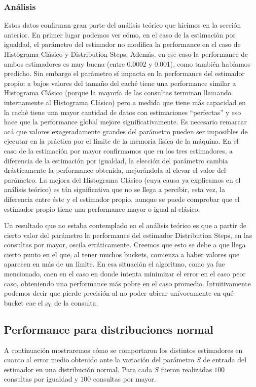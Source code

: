  \subsubsection*{Análisis}
Estos datos confirman gran parte del análisis teórico que hicimos en la sección anterior. En primer lugar podemos ver cómo, en el caso de la estimación por igualdad, el parámetro del estimador no modifica la performance en el caso de Histograma Clásico y Distribution Steps. Además, en ese caso la performance de ambos estimadores es muy buena (entre 0.0002 y 0.001), como también habíamos predicho. 
Sin embargo el parámetro sí impacta en la performance del estimador propio: a bajos valores del tamaño del caché tiene una performance similar a Histograma Clásico (porque la mayoría de las consultas terminan llamando internamente al Histograma Clásico) pero a medida que tiene más capacidad en la caché tiene una mayor cantidad de datos con estimaciones ``perfectas'' y eso hace que la performance global mejore significativamente. Es necesario remarcar acá que valores exageradamente grandes del parámetro pueden ser imposibles de ejecutar en la práctica por el límite de la memoria física de la máquina.
En el caso de la estimación por mayor confirmamos que en los tres estimadores, a diferencia de la estimación por igualdad, la elección del parámetro cambia drásticamente la performance obtenida, mejorándola al elevar el valor del parámetro. La mejora del Histograma Clásico (cuya causa ya explicamos en el análisis teórico) es tán significativa que no se llega a percibir, esta vez, la diferencia entre éste y el estimador propio, aunque se puede comprobar que el estimador propio tiene una performance mayor o igual al clásico.

Un resultado que no estaba contemplado en el análisis teórico es que a partir de cierto valor del parámetro la performance del estimador Distribution Steps, en las consultas por mayor, oscila erráticamente. Creemos que esto se debe a que llega cierto punto en el que, al tener muchos buckets, comienza a haber valores que aparecen en más de un límite. En esa situación el algoritmo, como ya fue mencionado, caen en el caso en donde intenta minimizar el error en el caso peor caso, obteniendo una performance más pobre en el caso promedio. Intuitivamente podemos decir que pierde precisión al no poder ubicar unívocamente en qué bucket cae el $x_0$ de la consulta.
 
 \subsection{Performance para distribuciones normal}
A continuación mostraremos cómo se comportaron los distintos estimadores en cuanto al error medio obtenido ante la variación del parámetro $S$ de entrada del estimador en una distribución normal. Para cada $S$ fueron realizadas $100$ consultas por igualdad y $100$ consultas por mayor.

